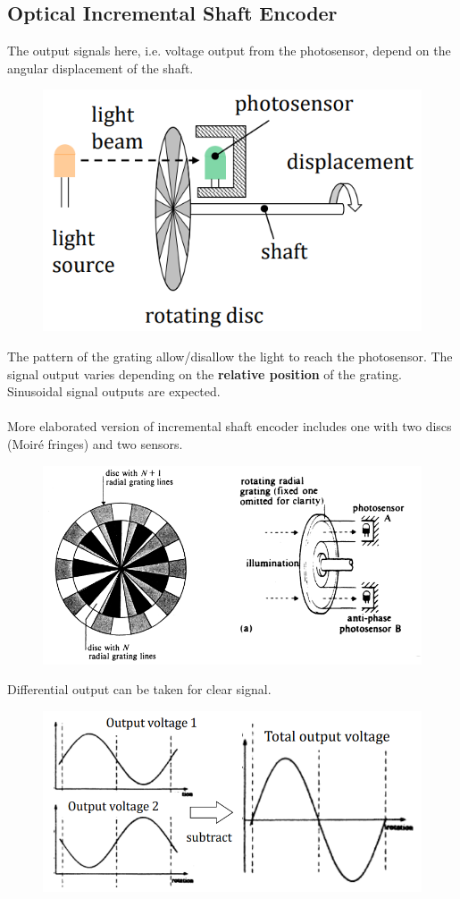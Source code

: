 \documentclass[class=report, crop=false, 12pt,a4paper]{standalone}
\begin{document}
\subsection{Optical Incremental Shaft Encoder}
The output signals here, i.e. voltage output from the photosensor, depend on the angular displacement of the shaft.
\begin{figure}[H]
  \centering
  \includegraphics[width = 0.6 \textwidth]{../img/Mdiagram12.PNG}
\end{figure}
The pattern of the grating allow/disallow the light to reach the photosensor. The signal output varies depending on the \textbf{relative position} of the grating. Sinusoidal signal outputs are expected. \\\\
More elaborated version of incremental shaft encoder includes one with two discs (Moiré fringes) and two sensors.
\begin{figure}[H]
  \centering
  \includegraphics[width = 0.7 \textwidth]{../img/Mdiagram13.PNG}
\end{figure}
Differential output can be taken for clear signal.
\begin{figure}[H]
  \centering
  \includegraphics[width = 0.75 \textwidth]{../img/Mdiagram14.PNG}
\end{figure}
\end{document}
